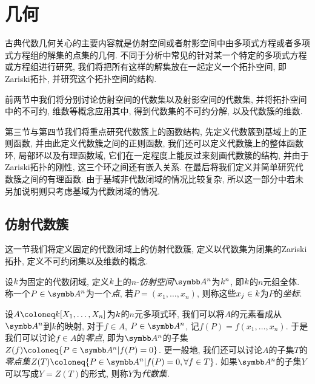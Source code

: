 
\section{几何}\label{sec:geometry}

古典代数几何关心的主要内容就是仿射空间或者射影空间中由多项式方程或者多项式方程组的解集的点集的几何. 不同于分析中常见的针对某一个特定的多项式方程或方程组进行研究, 我们将把所有这样的解集放在一起定义一个拓扑空间, 即Zariski拓扑, 并研究这个拓扑空间的结构.

前两节中我们将分别讨论仿射空间的代数集以及射影空间的代数集, 并将拓扑空间中的不可约, 维数等概念应用其中, 得到代数集的不可约分解, 以及代数簇的维数.

第三节与第四节我们将重点研究代数簇上的函数结构, 先定义代数簇到基域上的正则函数, 并由此定义代数簇之间的正则函数, 我们还可以定义代数簇上的整体函数环, 局部环以及有理函数域, 它们在一定程度上能反过来刻画代数簇的结构, 并由于Zariski拓扑的刚性, 这三个环之间还有嵌入关系. 在最后将我们定义并简单研究代数簇之间的有理函数. 由于基域非代数闭域的情况比较复杂, 所以这一部分中若未另加说明则只考虑基域为代数闭域的情况.

\subsection{仿射代数簇}\label{sec:varietyaffine}

这一节我们将定义固定的代数闭域上的仿射代数簇, 定义以代数集为闭集的Zariski拓扑, 定义不可约闭集以及维数的概念.

\begin{definition}
  设$k$为固定的代数闭域, 定义$k$上的$n$-\emph{仿射空间}$\AF^n$为$k^n$, 即$k$的$n$元组全体. 称一个$P\in \AF^n$为一个\emph{点}, 若$P=(x_1, \dotsc, x_n)$, 则称这些$x_j\in k$为$P$的\emph{坐标}.
\end{definition}

\begin{definition}
  设$A\coloneq \kk[X_1, \dotsc, X_n]$为$k$的$n$元多项式环, 我们可以将$A$的元素看成从$\AF^n$到$k$的映射, 对于$f\in A$, $P\in \AF^n$, 记$f(P)=f(x_1, \dotsc, x_n)$. 于是我们可以讨论$f\in A$的\emph{零点}, 即为$\AF^n$的子集$Z(f)\coloneq \{P\in \AF^n\vert f(P)=0\}$. 更一般地, 我们还可以讨论$A$的子集$T$的\emph{零点集}$Z(T)\coloneq \{P\in \AF^n\vert f(P)=0, \forall f\in T\}$. 如果$\AF^n$的子集$Y$可以写成$Y=Z(T)$的形式, 则称$Y$为\emph{代数集}.
\end{definition}

